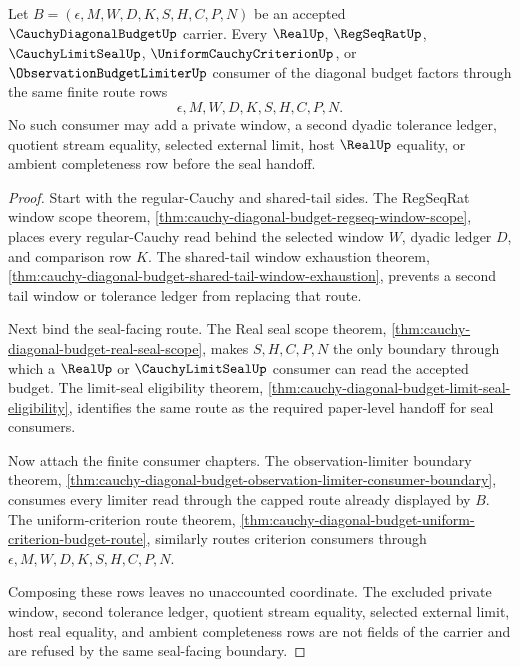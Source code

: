 \begin{theorem}
\label{thm:cauchy-diagonal-budget-finite-route-terminality}
Let $B=(\epsilon,M,W,D,K,S,H,C,P,N)$ be an accepted $\CauchyDiagonalBudgetUp$ carrier. Every $\RealUp$, $\RegSeqRatUp$, $\CauchyLimitSealUp$, $\UniformCauchyCriterionUp$, or $\ObservationBudgetLimiterUp$ consumer of the diagonal budget factors through the same finite route rows
$$
\epsilon,M,W,D,K,S,H,C,P,N.
$$
No such consumer may add a private window, a second dyadic tolerance ledger, quotient stream equality, selected external limit, host $\RealUp$ equality, or ambient completeness row before the seal handoff.
\end{theorem}
\begin{proof}
Start with the regular-Cauchy and shared-tail sides. The RegSeqRat window scope theorem, \autoref{thm:cauchy-diagonal-budget-regseq-window-scope}, places every regular-Cauchy read behind the selected window $W$, dyadic ledger $D$, and comparison row $K$. The shared-tail window exhaustion theorem, \autoref{thm:cauchy-diagonal-budget-shared-tail-window-exhaustion}, prevents a second tail window or tolerance ledger from replacing that route.

Next bind the seal-facing route. The Real seal scope theorem, \autoref{thm:cauchy-diagonal-budget-real-seal-scope}, makes $S,H,C,P,N$ the only boundary through which a $\RealUp$ or $\CauchyLimitSealUp$ consumer can read the accepted budget. The limit-seal eligibility theorem, \autoref{thm:cauchy-diagonal-budget-limit-seal-eligibility}, identifies the same route as the required paper-level handoff for seal consumers.

Now attach the finite consumer chapters. The observation-limiter boundary theorem, \autoref{thm:cauchy-diagonal-budget-observation-limiter-consumer-boundary}, consumes every limiter read through the capped route already displayed by $B$. The uniform-criterion route theorem, \autoref{thm:cauchy-diagonal-budget-uniform-criterion-budget-route}, similarly routes criterion consumers through $\epsilon,M,W,D,K,S,H,C,P,N$.

Composing these rows leaves no unaccounted coordinate. The excluded private window, second tolerance ledger, quotient stream equality, selected external limit, host real equality, and ambient completeness rows are not fields of the carrier and are refused by the same seal-facing boundary.
\end{proof}


